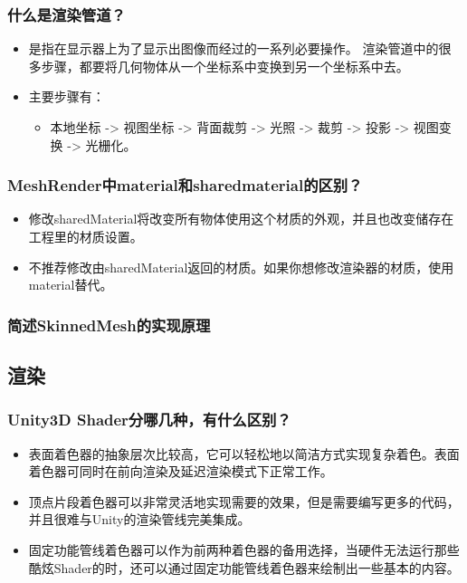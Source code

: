 \documentclass[9pt, b5paper]{article}
\begin{document}
\subsubsection{什么是渲染管道？}
\label{sec:org243537d}
\begin{itemize}
\item 是指在显示器上为了显示出图像而经过的一系列必要操作。 渲染管道中的很多步骤，都要将几何物体从一个坐标系中变换到另一个坐标系中去。
\item 主要步骤有：
\begin{itemize}
\item 本地坐标 -> 视图坐标 -> 背面裁剪 -> 光照 -> 裁剪 -> 投影 -> 视图变换 -> 光栅化。
\end{itemize}
\end{itemize}
\subsubsection{MeshRender中material和sharedmaterial的区别？}
\label{sec:org9352856}
\begin{itemize}
\item 修改sharedMaterial将改变所有物体使用这个材质的外观，并且也改变储存在工程里的材质设置。
\item 不推荐修改由sharedMaterial返回的材质。如果你想修改渲染器的材质，使用material替代。
\end{itemize}
\subsubsection{简述SkinnedMesh的实现原理}
\label{sec:org01aade6}

\subsection{渲染}
\label{sec:org5a891bc}
\subsubsection{Unity3D Shader分哪几种，有什么区别？}
\label{sec:org8124d6e}
\begin{itemize}
\item 表面着色器的抽象层次比较高，它可以轻松地以简洁方式实现复杂着色。表面着色器可同时在前向渲染及延迟渲染模式下正常工作。
\item 顶点片段着色器可以非常灵活地实现需要的效果，但是需要编写更多的代码，并且很难与Unity的渲染管线完美集成。
\item 固定功能管线着色器可以作为前两种着色器的备用选择，当硬件无法运行那些酷炫Shader的时，还可以通过固定功能管线着色器来绘制出一些基本的内容。
\end{itemize}
\end{document}
